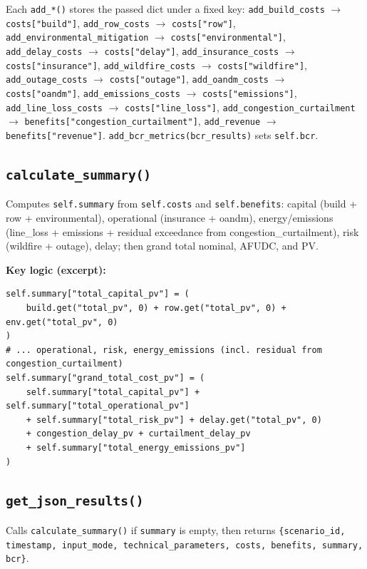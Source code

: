 \documentclass[ctcc_full_documentation.tex]{subfiles}
\begin{document}
Each \texttt{add\_*()} stores the passed dict under a fixed key: \texttt{add\_build\_costs} $\to$ \texttt{costs["build"]}, \texttt{add\_row\_costs} $\to$ \texttt{costs["row"]}, \texttt{add\_environmental\_mitigation} $\to$ \texttt{costs["environmental"]}, \texttt{add\_delay\_costs} $\to$ \texttt{costs["delay"]}, \texttt{add\_insurance\_costs} $\to$ \texttt{costs["insurance"]}, \texttt{add\_wildfire\_costs} $\to$ \texttt{costs["wildfire"]}, \texttt{add\_outage\_costs} $\to$ \texttt{costs["outage"]}, \texttt{add\_oandm\_costs} $\to$ \texttt{costs["oandm"]}, \texttt{add\_emissions\_costs} $\to$ \texttt{costs["emissions"]}, \texttt{add\_line\_loss\_costs} $\to$ \texttt{costs["line\_loss"]}, \texttt{add\_congestion\_curtailment} $\to$ \texttt{benefits["congestion\_curtailment"]}, \texttt{add\_revenue} $\to$ \texttt{benefits["revenue"]}. \texttt{add\_bcr\_metrics(bcr\_results)} sets \texttt{self.bcr}.

\subsection{\texttt{calculate\_summary()}}

Computes \texttt{self.summary} from \texttt{self.costs} and \texttt{self.benefits}: capital (build + row + environmental), operational (insurance + oandm), energy/emissions (line\_loss + emissions + residual exceedance from congestion\_curtailment), risk (wildfire + outage), delay; then grand total nominal, AFUDC, and PV.

\textbf{Key logic (excerpt):}
\begin{lstlisting}
self.summary["total_capital_pv"] = (
    build.get("total_pv", 0) + row.get("total_pv", 0) + env.get("total_pv", 0)
)
# ... operational, risk, energy_emissions (incl. residual from congestion_curtailment)
self.summary["grand_total_cost_pv"] = (
    self.summary["total_capital_pv"] + self.summary["total_operational_pv"]
    + self.summary["total_risk_pv"] + delay.get("total_pv", 0)
    + congestion_delay_pv + curtailment_delay_pv
    + self.summary["total_energy_emissions_pv"]
)
\end{lstlisting}

\subsection{\texttt{get\_json\_results()}}

Calls \texttt{calculate\_summary()} if \texttt{summary} is empty, then returns \texttt{\{scenario\_id, timestamp, input\_mode, technical\_parameters, costs, benefits, summary, bcr\}}.
\end{document}
